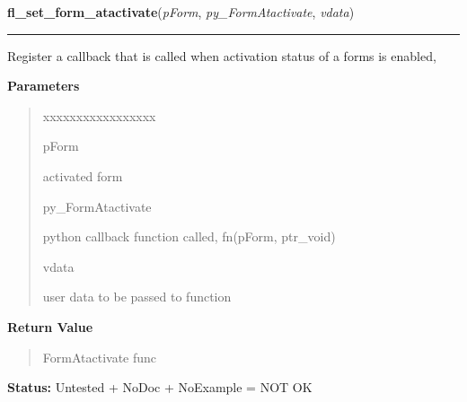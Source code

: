 \hspace{.8\funcindent}\begin{boxedminipage}{\funcwidth}

    \raggedright \textbf{fl\_set\_form\_atactivate}(\textit{pForm}, \textit{py\_FormAtactivate}, \textit{vdata})

    \vspace{-1.5ex}

    \rule{\textwidth}{0.5\fboxrule}
\setlength{\parskip}{2ex}
    Register a callback that is called when activation status of a forms is
    enabled,

\setlength{\parskip}{1ex}
      \textbf{Parameters}
      \vspace{-1ex}

      \begin{quote}
        \begin{Ventry}{xxxxxxxxxxxxxxxxx}

          \item[pForm]

          activated form

          \item[py\_FormAtactivate]

          python callback function called, fn(pForm, ptr\_void)

          \item[vdata]

          user data to be passed to function

        \end{Ventry}

      \end{quote}

      \textbf{Return Value}
    \vspace{-1ex}

      \begin{quote}
      FormAtactivate func

      \end{quote}

\textbf{Status:} Untested + NoDoc + NoExample = NOT OK



    \end{boxedminipage}

    \label{xformslib:library:fl_set_form_atdeactivate}

    \vspace{0.5ex}

